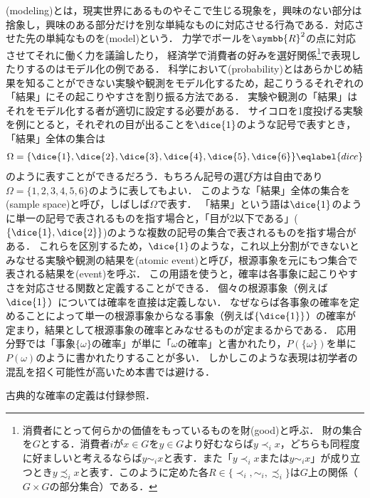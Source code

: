 \documentclass[main.tex]{subfiles}
\begin{document}

(modeling)とは，現実世界にあるものやそこで生じる現象を，興味のない部分は捨象し，興味のある部分だけを別な単純なものに対応させる行為である．対応させた先の単純なものを(model)という．
力学でボールを\(\symbb{R}^2\)の点に対応させてそれに働く力を議論したり，
経済学で消費者の好みを選好関係\footnote{%
消費者にとって何らかの価値をもっているものを財(good)と呼ぶ．
財の集合を\(G\)とする．消費者\(i\)が\(x \in G\)を\(y \in G\)より好むならば\(y \prec_i x\)，どちらも同程度に好ましいと考えるならば\(y \sim_i x\)と表す．また「\(y \prec_i x\)または\(y \sim_i x\)」が成り立つとき\(y \precsim_i x\)と表す．このように定めた各\(R \in \{\prec_i, \sim_i, \precsim_i\}\)は\(G\)上の関係（\(G \times G\)の部分集合）である．
}で表現したりするのはモデル化の例である．
科学において(probability)とはあらかじめ結果を知ることができない実験や観測をモデル化するため，起こりうるそれぞれの「結果」にその起こりやすさを割り振る方法である．
実験や観測の「結果」はそれをモデル化する者が適切に設定する必要がある．
サイコロを1度投げる実験を例にとると，それぞれの目が出ることを\(\dice{1}\)のような記号で表すとき，「結果」全体の集合は
\begin{align}
    \Omega = \{\dice{1}, \dice{2}, \dice{3}, \dice{4}, \dice{5}, \dice{6}\} \eqlabel{dice}
\end{align}
のように表すことができるだろう．もちろん記号の選び方は自由であり\(\Omega = \{1, 2, 3, 4, 5, 6\}\)のように表してもよい．
このような「結果」全体の集合を(sample space)と呼び，しばしば\(\Omega\)で表す．
「結果」という語は\(\dice{1}\)のように単一の記号で表されるものを指す場合と，「目が\(2\)以下である」(\(\{\dice{1}, \dice{2}\}\))のような複数の記号の集合で表されるものを指す場合がある．
これらを区別するため，\(\dice{1}\)のような，これ以上分割ができないとみなせる実験や観測の結果を(atomic event)と呼び，根源事象を元にもつ集合で表される結果を(event)を呼ぶ．
この用語を使うと，確率は各事象に起こりやすさを対応させる関数と定義することができる．
個々の根源事象（例えば\(\dice{1}\)）については確率を直接は定義しない．
なぜならば各事象の確率を定めることによって単一の根源事象からなる事象（例えば\(\{\dice{1}\}\)）の確率が定まり，結果として根源事象の確率とみなせるものが定まるからである．
応用分野では「事象\(\{\omega\}\)の確率」が単に「\(\omega\)の確率」と書かれたり，\(P(\{\omega\})\)を単に\(P(\omega)\)のように書かれたりすることが多い．
しかしこのような表現は初学者の混乱を招く可能性が高いため本書では避ける．

古典的な確率の定義\cite{laplace}は付録参照．
\end{document}
